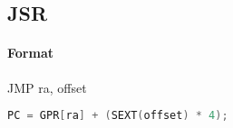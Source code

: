\subsection{JSR}


\paragraph{Format} JMP ra, offset

\begin{lstlisting}[language=C]
    PC = GPR[ra] + (SEXT(offset) * 4);
\end{lstlisting}